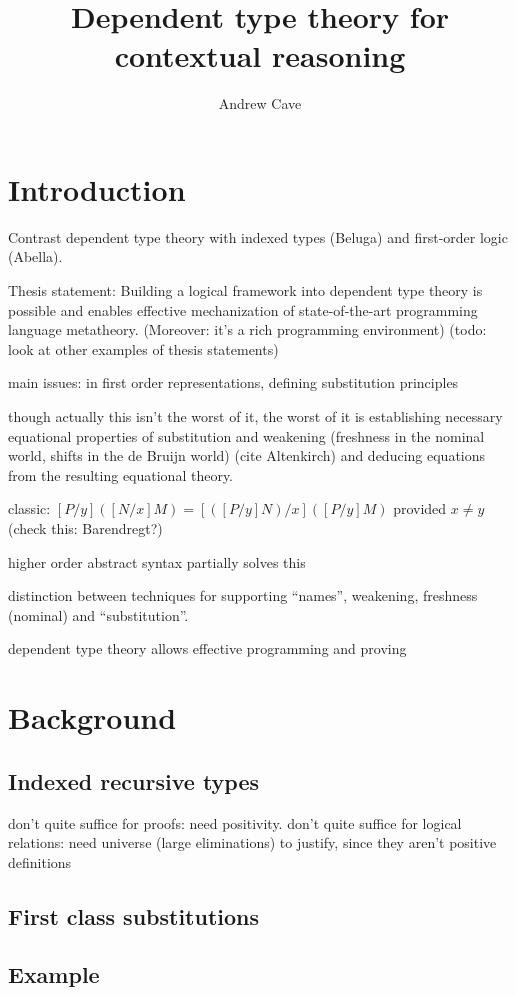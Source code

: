 \documentclass{article}
\author{Andrew Cave}
\title{Dependent type theory for contextual reasoning}
\begin{document}
\maketitle

\section{Introduction}
Contrast dependent type theory with indexed types (Beluga) and first-order
logic (Abella).

Thesis statement: Building a logical framework into dependent type
theory is possible and enables effective mechanization of state-of-the-art programming
language metatheory. (Moreover: it's a rich programming environment)
(todo: look at other examples of thesis statements)

main issues:
in first order representations, defining substitution principles

though actually this isn't the worst of it, the worst of it is
establishing necessary equational properties of substitution and weakening
(freshness in the nominal world, shifts in the de Bruijn world) (cite
Altenkirch) and deducing equations from the resulting equational
theory.

classic: $[P/y]([N/x]M) = [([P/y]N)/x] ([P/y]M)$ provided $x\neq y$
(check this: Barendregt?)

higher order abstract syntax partially solves this

distinction between techniques for supporting ``names'', weakening, freshness (nominal) and ``substitution''.

dependent type theory allows effective programming and proving
\section{Background}
\subsection{Indexed recursive types}

don't quite suffice for proofs: need positivity. don't quite suffice
for logical relations: need universe (large eliminations) to justify,
since they aren't positive definitions
\subsection{First class substitutions}

\subsection{Example}
\end{document}
